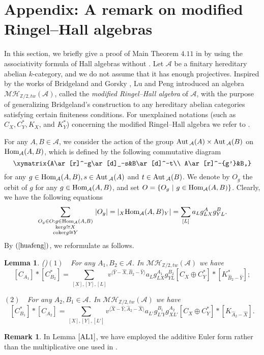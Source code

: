 \documentclass[reqno,12pt]{amsart}
\numberwithin{equation}{section}
\def\lr#1{\langle #1\rangle} \def\fin{\hfill$\square$}  \def\lra{\longrightarrow} \def\Tor{\mbox{\rm Tor}\,}
\def\A{{\mathcal A}}\def\P{{\mathscr{P}}}
\theoremstyle{plain} %
\newtheorem{lemma}[theorem]{\bf Lemma}
\theoremstyle{definition} %
\newtheorem{remark}[theorem]{\bf Remark}
\begin{document}
\section{Appendix: A remark on modified Ringel--Hall algebras}
In this section, we briefly give a proof of Main Theorem $4.11$ in \cite{LP} by using the  associativity formula of Hall algebras without \cite[Lemma 4.10]{LP}. Let $\A$ be a finitary hereditary abelian $k$-category, and we do not assume that it has enough projectives. Inspired by the works of Bridgeland \cite{Br} and Gorsky \cite{Gor2}, Lu and Peng \cite{LP} introduced an algebra $\mathcal {M}\mathcal {H}_{\mathbb{Z}/2,tw}(\A)$, called the {\em modified Ringel--Hall algebra} of $\A$, with the purpose of generalizing Bridgeland's construction to any hereditary abelian categories satisfying certain finiteness conditions.
For unexplained notations (such as $C_X,C_Y^\ast,K_X$, and $K_Y^\ast$) concerning the modified Ringel--Hall algebra we refer to \cite{LP}.

For any $A,B\in\A$, we consider the action of the group $\Aut_{\A}(A)\times\Aut_{\A}(B)$ on $\Hom_{\A}(A,B)$, which is defined by the following commutative diagram
$$\xymatrix{A\ar[r]^-g\ar[d]_-s&B\ar[d]^-t\\
A\ar[r]^-{g'}&B,}$$ for any $g\in\Hom_{\A}(A,B), s\in\Aut_{\A}(A)$ and $t\in\Aut_{\A}(B)$. We denote by $O_g$ the orbit of $g$ for any $g\in\Hom_{\A}(A,B)$, and set $O=\{O_g~|~g\in\Hom_{\A}(A,B)\}$. Clearly, we have the following equations
\begin{equation}\label{huafeng}\sum_{\begin{smallmatrix}O_g\in O: g\in{\rm Hom}_{\A}(A,B)\\
{\rm ker} g\cong X\\
{\rm coker} g\cong Y\end{smallmatrix}}|O_g|=|{}_X\Hom_{\A}(A,B)_Y|=\sum_{[L]}a_Lg_{LX}^{A}g_{YL}^{B}.\end{equation}
By $(\ref{huafeng})$, we reformulate \cite[Lemma 4.9]{LP} as follows.
\begin{lemma}{\rm(\cite{LP})}\label{AL1}
$(1)$~~For any $A_1,B_2\in\A$. In $\mathcal {M}\mathcal {H}_{\mathbb{Z}/2,tw}(\A)$ we have
$$[C_{A_1}]\ast[C_{B_2}^\ast]=\sum_{[X],[Y],[L]}v^{\lr{\hat{Y}-\hat{X},\hat{B}_2-\hat{Y}}}a_Lg_{LX}^{A_1}g_{YL}^{B_2}[C_X\oplus C_Y^\ast]\ast[K_{\hat{B}_2-\hat{Y}}^\ast];$$

$(2)$~~For any $A_2,B_1\in\A$. In $\mathcal {M}\mathcal {H}_{\mathbb{Z}/2,tw}(\A)$ we have
$$[C_{B_1}^\ast]\ast[C_{A_2}]=\sum_{[X],[Y],[L']}v^{\lr{\hat{X}-\hat{Y},\hat{A}_2-\hat{X}}}a_{L'}g_{L'Y}^{B_1}g_{XL'}^{A_2}[C_X\oplus C_Y^\ast]\ast[K_{\hat{A}_2-\hat{X}}].$$
\end{lemma}
\begin{remark}
In Lemma $\ref{AL1}$, we have employed the additive Euler form rather than the multiplicative one used in \cite{LP}.
\end{remark}
\end{document}
